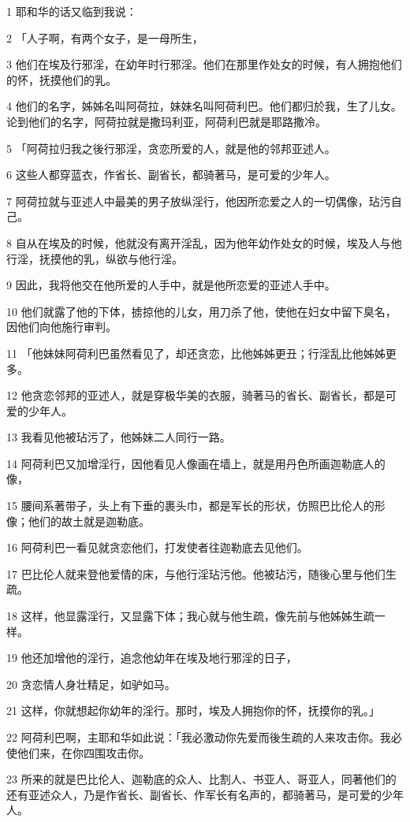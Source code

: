 \par 1 耶和华的话又临到我说：
\par 2 「人子啊，有两个女子，是一母所生，
\par 3 他们在埃及行邪淫，在幼年时行邪淫。他们在那里作处女的时候，有人拥抱他们的怀，抚摸他们的乳。
\par 4 他们的名字，姊姊名叫阿荷拉，妹妹名叫阿荷利巴。他们都归於我，生了儿女。论到他们的名字，阿荷拉就是撒玛利亚，阿荷利巴就是耶路撒冷。
\par 5 「阿荷拉归我之後行邪淫，贪恋所爱的人，就是他的邻邦亚述人。
\par 6 这些人都穿蓝衣，作省长、副省长，都骑著马，是可爱的少年人。
\par 7 阿荷拉就与亚述人中最美的男子放纵淫行，他因所恋爱之人的一切偶像，玷污自己。
\par 8 自从在埃及的时候，他就没有离开淫乱，因为他年幼作处女的时候，埃及人与他行淫，抚摸他的乳，纵欲与他行淫。
\par 9 因此，我将他交在他所爱的人手中，就是他所恋爱的亚述人手中。
\par 10 他们就露了他的下体，掳掠他的儿女，用刀杀了他，使他在妇女中留下臭名，因他们向他施行审判。
\par 11 「他妹妹阿荷利巴虽然看见了，却还贪恋，比他姊姊更丑；行淫乱比他姊姊更多。
\par 12 他贪恋邻邦的亚述人，就是穿极华美的衣服，骑著马的省长、副省长，都是可爱的少年人。
\par 13 我看见他被玷污了，他姊妹二人同行一路。
\par 14 阿荷利巴又加增淫行，因他看见人像画在墙上，就是用丹色所画迦勒底人的像，
\par 15 腰间系著带子，头上有下垂的裹头巾，都是军长的形状，仿照巴比伦人的形像；他们的故土就是迦勒底。
\par 16 阿荷利巴一看见就贪恋他们，打发使者往迦勒底去见他们。
\par 17 巴比伦人就来登他爱情的床，与他行淫玷污他。他被玷污，随後心里与他们生疏。
\par 18 这样，他显露淫行，又显露下体；我心就与他生疏，像先前与他姊姊生疏一样。
\par 19 他还加增他的淫行，追念他幼年在埃及地行邪淫的日子，
\par 20 贪恋情人身壮精足，如驴如马。
\par 21 这样，你就想起你幼年的淫行。那时，埃及人拥抱你的怀，抚摸你的乳。」
\par 22 阿荷利巴啊，主耶和华如此说：「我必激动你先爱而後生疏的人来攻击你。我必使他们来，在你四围攻击你。
\par 23 所来的就是巴比伦人、迦勒底的众人、比割人、书亚人、哥亚人，同著他们的还有亚述众人，乃是作省长、副省长、作军长有名声的，都骑著马，是可爱的少年人。
